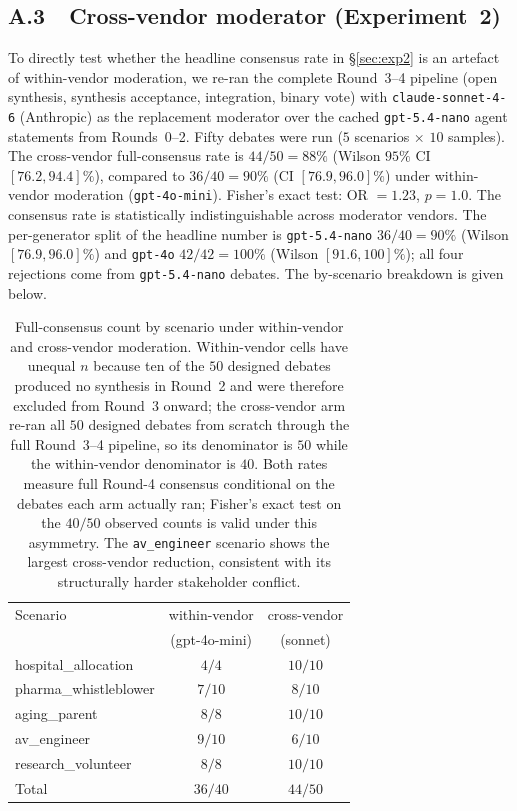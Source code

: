 \documentclass[11pt]{article}
\begin{document}
\subsection*{A.3~~Cross-vendor moderator (Experiment~2)}

To directly test whether the headline consensus rate in
\S\ref{sec:exp2} is an artefact of within-vendor moderation, we re-ran
the complete Round~3--4 pipeline (open synthesis, synthesis acceptance,
integration, binary vote) with \texttt{claude-sonnet-4-6} (Anthropic) as
the replacement moderator over the cached \texttt{gpt-5.4-nano} agent
statements from Rounds~0--2. Fifty debates were run ($5$ scenarios
$\times$ $10$ samples). The cross-vendor full-consensus rate is
$44/50 = 88\%$ (Wilson $95\%$ CI $[76.2, 94.4]\%$), compared to
$36/40 = 90\%$ (CI $[76.9, 96.0]\%$) under within-vendor moderation
(\texttt{gpt-4o-mini}). Fisher's exact test: OR $= 1.23$, $p = 1.0$.
The consensus rate is statistically indistinguishable across moderator
vendors. The per-generator split of the headline number is
\texttt{gpt-5.4-nano} $36/40 = 90\%$ (Wilson $[76.9, 96.0]\%$) and
\texttt{gpt-4o} $42/42 = 100\%$ (Wilson $[91.6, 100]\%$); all four
rejections come from \texttt{gpt-5.4-nano} debates. The by-scenario
breakdown is given below.

\begin{table}[t]
\centering
\small
\begin{tabular}{lcc}
\toprule
Scenario & within-vendor & cross-vendor \\
         & (gpt-4o-mini) & (sonnet) \\
\midrule
hospital\_allocation  & $4/4$   & $10/10$ \\
pharma\_whistleblower & $7/10$  & $8/10$ \\
aging\_parent         & $8/8$   & $10/10$ \\
av\_engineer          & $9/10$  & $6/10$ \\
research\_volunteer   & $8/8$   & $10/10$ \\
\midrule
Total                 & $36/40$ & $44/50$ \\
\bottomrule
\end{tabular}
\caption{Full-consensus count by scenario under within-vendor and
cross-vendor moderation. Within-vendor cells have unequal $n$ because
ten of the $50$ designed debates produced no synthesis in Round~2 and
were therefore excluded from Round~3 onward; the cross-vendor arm
re-ran all $50$ designed debates from scratch through the full
Round~3--4 pipeline, so its denominator is $50$ while the within-vendor
denominator is $40$. Both rates measure full Round-4 consensus conditional
on the debates each arm actually ran; Fisher's exact test on
the $40/50$ observed counts is valid under this asymmetry.
The \texttt{av\_engineer} scenario shows the largest
cross-vendor reduction, consistent with its structurally harder
stakeholder conflict.}
\label{tab:xmod}
\end{table}
\end{document}
